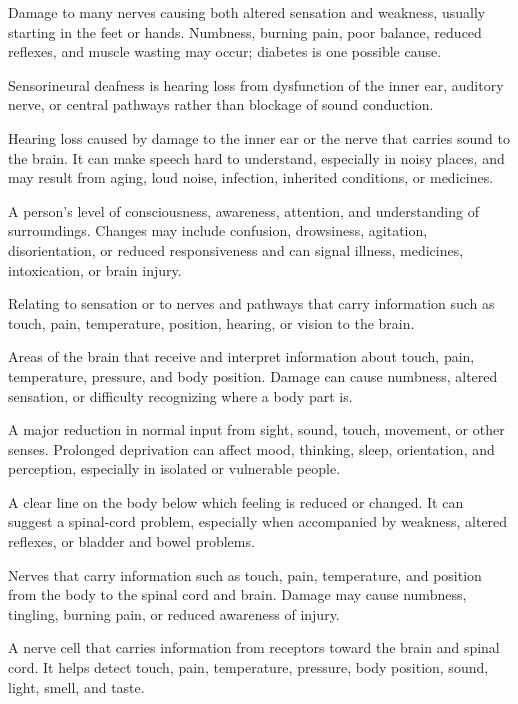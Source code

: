  Damage to many nerves causing both altered sensation and weakness, usually starting in the feet or hands. Numbness, burning pain, poor balance, reduced reflexes, and muscle wasting may occur; diabetes is one possible cause.

 Sensorineural deafness is hearing loss from dysfunction of the inner ear, auditory nerve, or central pathways rather than blockage of sound conduction.

 Hearing loss caused by damage to the inner ear or the nerve that carries sound to the brain. It can make speech hard to understand, especially in noisy places, and may result from aging, loud noise, infection, inherited conditions, or medicines.

 A person’s level of consciousness, awareness, attention, and understanding of surroundings. Changes may include confusion, drowsiness, agitation, disorientation, or reduced responsiveness and can signal illness, medicines, intoxication, or brain injury.

 Relating to sensation or to nerves and pathways that carry information such as touch, pain, temperature, position, hearing, or vision to the brain.

 Areas of the brain that receive and interpret information about touch, pain, temperature, pressure, and body position. Damage can cause numbness, altered sensation, or difficulty recognizing where a body part is.

 A major reduction in normal input from sight, sound, touch, movement, or other senses. Prolonged deprivation can affect mood, thinking, sleep, orientation, and perception, especially in isolated or vulnerable people.

 A clear line on the body below which feeling is reduced or changed. It can suggest a spinal-cord problem, especially when accompanied by weakness, altered reflexes, or bladder and bowel problems.

 Nerves that carry information such as touch, pain, temperature, and position from the body to the spinal cord and brain. Damage may cause numbness, tingling, burning pain, or reduced awareness of injury.

 A nerve cell that carries information from receptors toward the brain and spinal cord. It helps detect touch, pain, temperature, pressure, body position, sound, light, smell, and taste.

